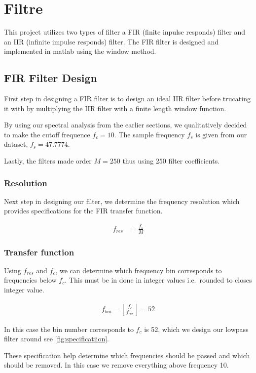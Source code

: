 \section{Filtre}
This project utilizes two types of filter a FIR (finite inpulse responds) 
filter and an IIR (infinite impulse responds) filter.
The FIR filter is designed and implemented in matlab using the window method.

\subsection{FIR Filter Design}
First step in designing a FIR filter is to design an ideal IIR filter before
trucating it with by multiplying the IIR filter with a finite length window
function. 

By using our spectral analysis from the earlier sections, we qualitatively
decided to make the cutoff frequence $f_{c} = 10$. The sample frequency $f_{s}$
is given from our dataset, $f_{s} = 47.7774$.

Lastly, the filters made order $M = 250$ thus using $250$ filter coefficients. 

\subsubsection{Resolution}
Next step in designing our filter, we determine the frequency resolution
which provides specifications for the FIR transfer function.

\begin{align}
  \label{eq:freqResolution}
  f_{res} &= \frac{f_{s}}{M}
\end{align}

\subsubsection{Transfer function}
Using $f_{res}$ and $f_{c}$, we can determine which frequency bin
corresponds to frequencies below $f_c$.
This must be in done in integer values i.e.\ rounded to 
closes integer value.

\begin{align}
  \label{eq:freqBin}
  f_{bin} = \left\lfloor\frac{f_{c}}{f_{res}}\right\rfloor = 52
\end{align}

In this case the bin number corresponds to $f_c$ is 52, which
we design our lowpass filter around see \autoref{fig:specificatiion}.

These specification help determine which frequencies should be passed and which should be removed. In this case we remove everything above frequency 10.

